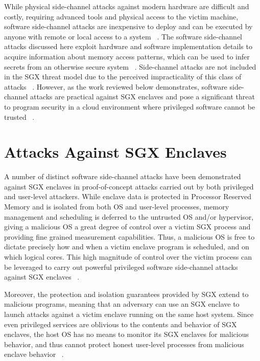 While physical side-channel attacks against modern hardware are difficult and costly, requiring advanced tools and physical access to the victim machine, software side-channel attacks are inexpensive to deploy and can be executed by anyone with remote or local access to a system ~\cite{costan_intel_2016}. The software side-channel attacks discussed here exploit hardware and software implementation details to acquire information about memory access patterns, which can be used to infer secrets from an otherwise secure system ~\cite{gotzfried_cache_2017, schwarz_malware_2017, xu_controlled-channel_2015, shinde_preventing_2015}. Side-channel attacks are not included in the SGX threat model due to the perceived impracticality of this class of attacks ~\cite{intel_corporation_intel_2016, costan_intel_2016}. However, as the work reviewed below demonstrates, software side-channel attacks are practical against SGX enclaves and pose a significant threat to program security in a cloud environment where privileged software cannot be trusted ~\cite{moghimi_cachezoom:_2017, intel_corporation_tutorial_2015}.

\section{Attacks Against SGX Enclaves}

A number of distinct software side-channel attacks have been demonstrated against SGX enclaves in proof-of-concept attacks carried out by both privileged and user-level attackers. While enclave data is protected in Processor Reserved Memory and is isolated from both OS and user-level processes, memory management and scheduling is deferred to the untrusted OS and/or hypervisor, giving a malicious OS a great degree of control over a victim SGX process and providing fine grained measurement capabilities. Thus, a malicious OS is free to dictate precisely how and when a victim enclave program is scheduled, and on which logical cores. This high magnitude of control over the victim process can be leveraged to carry out powerful privileged software side-channel attacks against SGX enclaves ~\cite{costan_intel_2016}. 

Moreover, the protection and isolation guarantees provided by SGX extend to malicious programs, meaning that an adversary can use an SGX enclave to launch attacks against a victim enclave running on the same host system. Since even privileged services are oblivious to the contents and behavior of SGX enclaves, the host OS has no means to monitor its SGX enclaves for malicious behavior, and thus cannot protect honest user-level processes from malicious enclave behavior ~\cite{costan_intel_2016, schwarz_malware_2017}.

